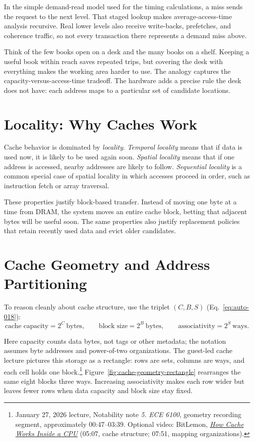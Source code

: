 In the simple demand-read model used for the timing calculations, a miss sends the request to the next level.
That staged lookup makes average-access-time analysis recursive.
Real lower levels also receive write-backs, prefetches, and coherence traffic, so not every transaction there represents a demand miss above.

Think of the few books open on a desk and the many books on a shelf.
Keeping a useful book within reach saves repeated trips, but covering the desk with everything makes the working area harder to use.
The analogy captures the capacity-versus-access-time tradeoff.
The hardware adds a precise rule the desk does not have: each address maps to a particular set of candidate locations.


\section{Locality: Why Caches Work}\label{sec:auto-021}
Cache behavior is dominated by \textit{locality}.
\textit{Temporal locality} means that if data is used now, it is likely to be used again soon.
\textit{Spatial locality} means that if one address is accessed, nearby addresses are likely to follow.
\textit{Sequential locality} is a common special case of spatial locality in which accesses proceed in order, such as instruction fetch or array traversal.

These properties justify block-based transfer.
Instead of moving one byte at a time from DRAM, the system moves an entire cache block, betting that adjacent bytes will be useful soon.
The same properties also justify replacement policies that retain recently used data and evict older candidates.


\section{Cache Geometry and Address Partitioning}\label{sec:auto-022}
To reason cleanly about cache structure, use the triplet $(C,B,S)$ (Eq.~\eqref{eq:auto-018}):
\begin{equation}\label{eq:auto-018}
    \text{cache capacity}=2^C\ \text{bytes},\qquad
    \text{block size}=2^B\ \text{bytes},\qquad
    \text{associativity}=2^S\ \text{ways}.
\end{equation}

Here capacity counts data bytes, not tags or other metadata; the notation assumes byte addresses and power-of-two organizations.
The guest-led cache lecture pictures this storage as a rectangle: rows are sets, columns are ways, and each cell holds one block.\footnote{January 27, 2026 lecture, Notability note \emph{5. ECE 6100}, geometry recording segment, approximately 00:47--03:39. Optional video: BitLemon, \href{https://youtu.be/zF4VMombo7U?t=307}{\emph{How Cache Works Inside a CPU}} (05:07, cache structure; 07:51, mapping organizations).}
Figure~\ref{fig:cache-geometry-rectangle} rearranges the same eight blocks three ways.
Increasing associativity makes each row wider but leaves fewer rows when data capacity and block size stay fixed.

